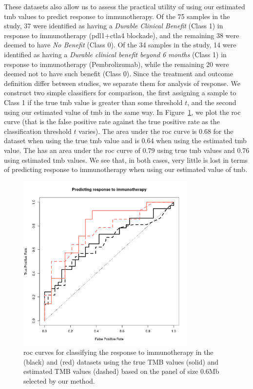 \documentclass[../thesis.tex]{subfiles}
\begin{document}
{{These datasets also allow} us to assess the practical utility of using our estimated \gls{tmb} values to predict response to immunotherapy. Of the 75 samples in the \citet{hellmann_genomic_2018} study, 37 were identified as having a \emph{Durable Clinical Benefit} (Class 1) in response to immunotherapy (\gls{pdl1}+\gls{ctla4} blockade), and the remaining 38 were deemed to have \emph{No Benefit} (Class 0). {Of the 34 samples in the \citet{rizvi_mutational_2015} study, 14 were identified as having a \emph{Durable clinical benefit beyond 6 months} (Class 1) in response to immunotherapy (Pembrolizumab), while the remaining 20 were deemed not to have such benefit (Class 0). Since the treatment and outcome definition differ between studies, we separate them for analysis of response}. We construct two simple classifiers for comparison, the first assigning a sample to Class 1 if the true \gls{tmb} value is greater than some threshold $t$, and the second using our estimated value of \gls{tmb} in the same way.  In Figure~\ref{fig:responseclass}, we plot the \gls{roc} curve (that is the false positive rate against the true positive rate as the classification threshold $t$ varies). The area under the \gls{roc} curve is 0.68 {for the \citet{hellmann_genomic_2018} dataset} when using the true \gls{tmb} value and is 0.64 when using the estimated \gls{tmb} value. {The \citet{rizvi_mutational_2015} has an area under the \gls{roc} curve of 0.79 using true \gls{tmb} values and 0.76 using estimated \gls{tmb} values.} We see that{, in both cases,} very little is lost in terms of predicting response to immunotherapy when using our estimated value of \gls{tmb}.}


\begin{figure}
    \centering
    \includegraphics[width=3.5in]{../figures/chapter3/response_pred_roc.png}
    \caption{{\gls{roc} curves for classifying the response to immunotherapy in the \citet{hellmann_genomic_2018} (black) and \citet{rizvi_mutational_2015} (red) datasets using the true TMB values (solid) and estimated TMB values (dashed) based on the panel of size 0.6Mb selected by our method.}}
    \label{fig:responseclass}
\end{figure}
\end{document}
